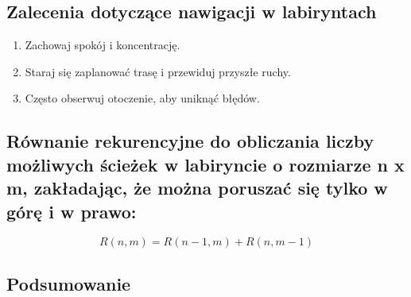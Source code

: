 \subsection{Zalecenia dotyczące nawigacji w labiryntach}
\begin{enumerate}
    \item Zachowaj spokój i koncentrację.
    \item Staraj się zaplanować trasę i przewiduj przyszłe ruchy.
    \item Często obserwuj otoczenie, aby uniknąć błędów.
\end{enumerate}

\subsection{Równanie rekurencyjne do obliczania liczby możliwych ścieżek w labiryncie o rozmiarze n x m, zakładając, że można poruszać się tylko w górę i w prawo:}
\[R(n, m) = R(n-1, m) + R(n, m-1)\]

\subsection{Podsumowanie}

